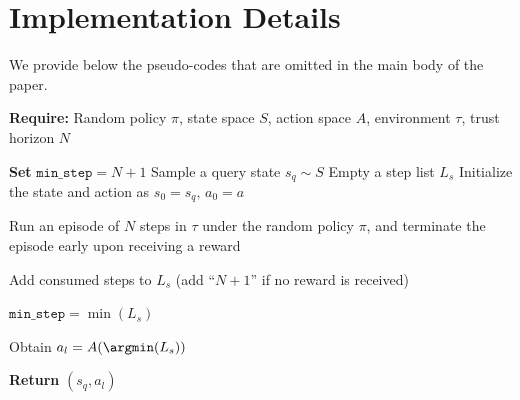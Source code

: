 \clearpage

\section{Implementation Details}
\label{appendix_implement}


We provide below the pseudo-codes that are omitted in the main body of the paper.





\begin{algorithm}[H]
\caption{Collecting Query States and Action Labels under Random Policy (Sparse-Reward MDP)}         \label{alg_collect_queries_sparse}
\begin{algorithmic}[1]
		\STATE \textbf{Require:} Random policy $\pi$, state space $S$, action space $A$, environment $\tau$, trust horizon $N$

            \STATE \textbf{Set} $\texttt{min\_step} = N+1$
                \STATE Sample a query state $s_q \sim S$
                \STATE Empty a step list $L_s$
                    \STATE Initialize the state and action as $s_0 = s_q, \, a_0 = a$
                    
                    \STATE Run an episode of $N$ steps in $\tau$ under the random policy $\pi$, and terminate the episode early upon receiving a reward

                    \STATE Add consumed steps to $L_s$ (add ``$N+1$'' if no reward is received)

                \ENDFOR
            \STATE $\texttt{min\_step} = \min (L_s)$

            \ENDWHILE
            \STATE Obtain $a_l = A(\argmin (L_s))$

        \STATE \textbf{Return} $(s_q, a_l)$

\end{algorithmic}
\end{algorithm}
















